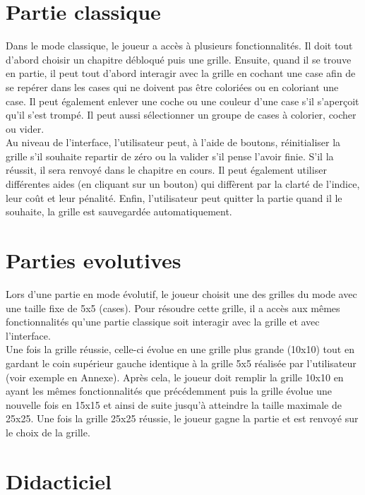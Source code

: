 \documentclass{report}
\begin{document}
      
	\section{Partie classique}
		Dans le mode classique, le joueur a accès à plusieurs fonctionnalités. Il doit tout d'abord choisir un chapitre débloqué puis une grille. Ensuite, quand il se trouve en partie, il peut tout d'abord interagir avec la grille en cochant une case afin de se repérer dans les cases qui ne doivent pas être coloriées ou en coloriant une case. Il peut également enlever une coche ou une couleur d'une case s'il s'aperçoit qu'il s'est trompé. Il peut aussi sélectionner un groupe de cases à colorier, cocher ou vider. \\
		Au niveau de l'interface, l'utilisateur peut, à l'aide de boutons, réinitialiser la grille s'il souhaite repartir de zéro ou la valider s'il pense l'avoir finie. S'il la réussit, il sera renvoyé dans le chapitre en cours. Il peut également utiliser différentes aides (en cliquant sur un bouton) qui diffèrent par la clarté de l'indice, leur coût et leur pénalité. Enfin, l'utilisateur peut quitter la partie quand il le souhaite, la grille est sauvegardée automatiquement.
	
	\section{Parties evolutives}
	
	Lors d'une partie en mode évolutif, le joueur choisit une des grilles du mode avec une taille fixe de 5x5 (cases). Pour résoudre cette grille, il a accès aux mêmes fonctionnalités qu'une partie classique soit interagir avec la grille et avec l'interface. \\
Une fois la grille réussie, celle-ci évolue en une grille plus grande (10x10) tout en gardant le coin supérieur gauche identique à la grille 5x5 réalisée par l'utilisateur (voir exemple en Annexe). Après cela, le joueur doit remplir la grille 10x10 en ayant les mêmes fonctionnalités que précédemment puis la grille évolue une nouvelle fois en 15x15 et ainsi de suite jusqu'à atteindre la taille maximale de 25x25. Une fois la grille 25x25 réussie, le joueur gagne la partie et est renvoyé sur le choix de la grille.
	
	
	\section{Didacticiel}
	
\end{document}
